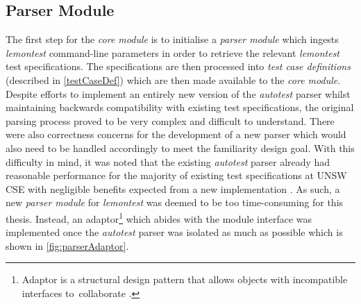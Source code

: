 \documentclass[hidelinks]{report}
\begin{document}
\subsection{Parser Module}
The first step for the \textit{core module} is to initialise a \textit{parser module} which ingests \textit{lemontest} command-line parameters in order to retrieve the relevant \textit{lemontest} test specifications. The specifications are then processed into \textit{test case definitions} (described in \autoref{testCaseDef}) which are then made available to the \textit{core module}. Despite efforts to implement an entirely new version of the \textit{autotest} parser whilst maintaining backwards compatibility with existing test specifications, the original parsing process proved to be very complex and difficult to understand. There were also correctness concerns for the development of a new parser which would also need to be handled accordingly to meet the familiarity design goal.
With this difficulty in mind, it was noted that the existing \textit{autotest} parser already had reasonable performance for the majority of existing test specifications at UNSW CSE with negligible benefits expected from a new implementation \cite{parserConversation}.
As such, a new \textit{parser module} for \textit{lemontest} was deemed to be too time-consuming for this thesis. Instead, an adaptor\footnote{Adaptor is a structural design pattern that allows objects with incompatible interfaces to collaborate \cite{adaptorPattern}.} which abides with the module interface was implemented once the \textit{autotest} parser was isolated as much as possible which is shown in \autoref{fig:parserAdaptor}.
\end{document}
